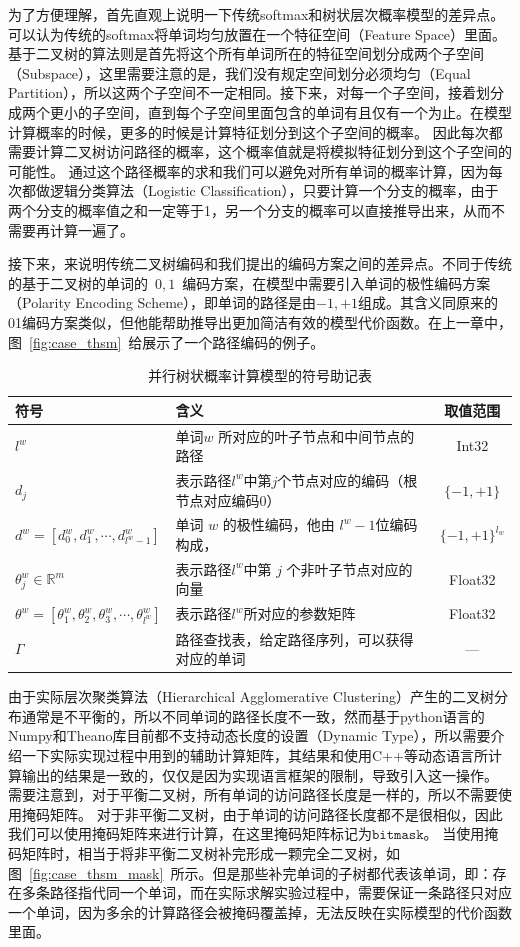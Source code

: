 为了方便理解，首先直观上说明一下传统softmax和树状层次概率模型的差异点。可以认为传统的softmax将单词均匀放置在一个特征空间（Feature Space）里面。基于二叉树的算法则是首先将这个所有单词所在的特征空间划分成两个子空间（Subspace），这里需要注意的是，我们没有规定空间划分必须均匀（Equal Partition），所以这两个子空间不一定相同。接下来，对每一个子空间，接着划分成两个更小的子空间，直到每个子空间里面包含的单词有且仅有一个为止。在模型计算概率的时候，更多的时候是计算特征划分到这个子空间的概率。
因此每次都需要计算二叉树访问路径的概率，这个概率值就是将模拟特征划分到这个子空间的可能性。
通过这个路径概率的求和我们可以避免对所有单词的概率计算，因为每次都做逻辑分类算法（Logistic Classification），只要计算一个分支的概率，由于两个分支的概率值之和一定等于1，另一个分支的概率可以直接推导出来，从而不需要再计算一遍了。


接下来，来说明传统二叉树编码和我们提出的编码方案之间的差异点。不同于传统的基于二叉树的单词的~$0,1$~编码方案，在模型中需要引入单词的极性编码方案（Polarity Encoding Scheme），即单词的路径是由$-1,+1$组成。其含义同原来的01编码方案类似，但他能帮助推导出更加简洁有效的模型代价函数。在上一章中，图~\ref{fig:case_thsm}~给展示了一个路径编码的例子。

\begin{table}[!t]
  \centering
  \caption{并行树状概率计算模型的符号助记表\label{tab:note}}
\begin{tabular}{llc}
  \toprule
   符号&含义&取值范围\\ \midrule
$l^w$ &单词$w$ 所对应的叶子节点和中间节点的路径&Int32 \\
$d_j$&表示路径$l^w$中第$j$个节点对应的编码（根节点对应编码$0$）&$ \{-1,+1\}$\\
$ d^w=[d_0^w,d_1^w,\cdots,d_{l^w-1}^w] $& 单词 $w$ 的极性编码，他由 $l^w-1$位编码构成，&$\{-1,+1\}^{l_w}$\\
$\theta_{j}^w\in\mathbb{R}^m$ &表示路径$l^w$中第 $j$ 个非叶子节点对应的向量& Float32\\
$ \theta^w=[\theta_1^w,\theta_2^w,\theta_3^w, \cdots,\theta_{l^w}^w]$&表示路径$l^w$所对应的参数矩阵&Float32 \\
$\Gamma$ &路径查找表，给定路径序列，可以获得对应的单词& ---\\
  \bottomrule
\end{tabular}
\end{table}

由于实际层次聚类算法（Hierarchical Agglomerative Clustering）产生的二叉树分布通常是不平衡的，所以不同单词的路径长度不一致，然而基于python语言的Numpy和Theano库目前都不支持动态长度的设置（Dynamic Type），所以需要介绍一下实际实现过程中用到的辅助计算矩阵，其结果和使用C++等动态语言所计算输出的结果是一致的，仅仅是因为实现语言框架的限制，导致引入这一操作。
需要注意到，对于平衡二叉树，所有单词的访问路径长度是一样的，所以不需要使用掩码矩阵。
对于非平衡二叉树，由于单词的访问路径长度都不是很相似，因此我们可以使用掩码矩阵来进行计算，在这里掩码矩阵标记为$\mathtt{bitmask}$。
当使用掩码矩阵时，相当于将非平衡二叉树补完形成一颗完全二叉树，如图~\ref{fig:case_thsm_mask}~所示。但是那些补完单词的子树都代表该单词，即：存在多条路径指代同一个单词，而在实际求解实验过程中，需要保证一条路径只对应一个单词，因为多余的计算路径会被掩码覆盖掉，无法反映在实际模型的代价函数里面。


